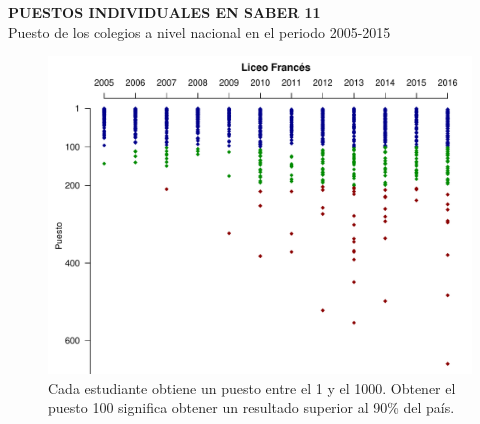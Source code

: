 \documentclass[letterpaper, 12pt]{book}\usepackage[]{graphicx}\usepackage[]{color}
\newenvironment{knitrout}{}{} %
\begin{document}
\newpage
\begin{center}
{\bf\Huge{PUESTOS INDIVIDUALES EN SABER 11}}\\
\vspace{0.1cm}
 Puesto de los colegios a nivel nacional en el periodo 2005-2015
\end{center}
\vspace{2cm}
\begin{center}
\begin{knitrout}
\color{fgcolor}\begin{figure}[H]
\includegraphics[width=.9\linewidth]{figure/pindiv-1} \caption[Cada estudiante obtiene un puesto entre el 1 y el 1000]{Cada estudiante obtiene un puesto entre el 1 y el 1000. Obtener el puesto 100 significa obtener un resultado superior al 90\% del país.}\label{fig:pindiv}
\end{figure}


\end{knitrout}
\end{center}
\end{document}
